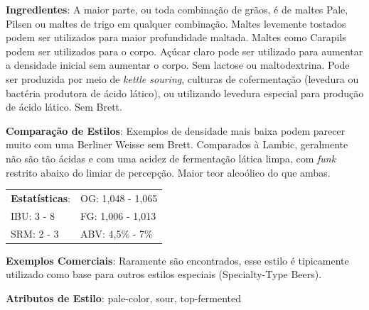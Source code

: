 \textbf{Ingredientes}: A maior parte, ou toda combinação de grãos, é de maltes Pale, Pilsen ou maltes de trigo em qualquer combinação. Maltes levemente tostados podem ser utilizados para maior profundidade maltada. Maltes como Carapils podem ser utilizados para o corpo. Açúcar claro pode ser utilizado para aumentar a densidade inicial sem aumentar o corpo. Sem lactose ou maltodextrina. Pode ser produzida por meio de \textit{kettle souring}, culturas de cofermentação (levedura ou bactéria produtora de ácido lático), ou utilizando levedura especial para produção de ácido lático. Sem Brett.

\textbf{Comparação de Estilos}: Exemplos de densidade mais baixa podem parecer muito com uma Berliner Weisse sem Brett. Comparados à Lambic, geralmente não são tão ácidas e com uma acidez de fermentação lática limpa, com \textit{funk} restrito abaixo do limiar de percepção. Maior teor alcoólico do que ambas.

\begin{tabular}{@{}p{35mm}p{35mm}@{}}
  \textbf{Estatísticas}: & OG: 1,048 - 1,065 \\
  IBU: 3 - 8  & FG: 1,006 - 1,013 \\
  SRM: 2 - 3  & ABV: 4,5\% - 7\%
\end{tabular}

\textbf{Exemplos Comerciais}: Raramente são encontrados, esse estilo é tipicamente utilizado como base para outros estilos especiais (Specialty-Type Beers).

\textbf{Atributos de Estilo}: pale-color, sour, top-fermented
